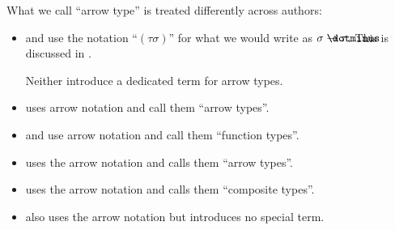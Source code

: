 \begin{remark}\label{rem:arrow_type_name}
  What we call \enquote{arrow type} is treated differently across authors:
  \begin{itemize}
    \item {} and  use the notation \enquote{\( (\tau\sigma) \)} for what we would write as \( \sigma \synimplies \tau \). This is discussed in .

    Neither introduce a dedicated term for arrow types.

    \item {} uses arrow notation and call them \enquote{arrow types}.

    \item {} and  use arrow notation and call them \enquote{function types}.

    \item {} uses the arrow notation and calls them \enquote{arrow types}.

    \item {} uses the arrow notation and calls them \enquote{composite types}.

    \item {} also uses the arrow notation but introduces no special term.
  \end{itemize}
\end{remark}

